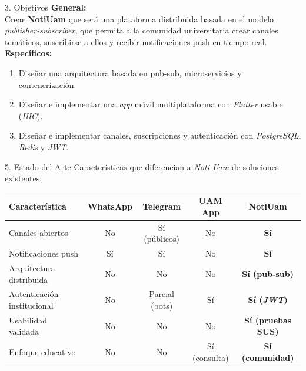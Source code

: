 \documentclass[final]{beamer}
\begin{document}
\begin{frame}[t]
\begin{minipage}[t]{0.48\textwidth}
        \begin{block}{\Large 3. Objetivos}
            \textbf{General:}\\
            Crear \textbf{NotiUam} que será una plataforma distribuida basada en el modelo \textit{publisher-subscriber}, que permita a la comunidad universitaria crear canales temáticos, suscribirse a ellos y recibir notificaciones push en tiempo real. 
            \\
            \vskip 0.8cm
            \textbf{Específicos:}
            \begin{enumerate}[leftmargin=*, itemsep=1pt]
                \item Diseñar una arquitectura basada en pub-sub, microservicios y contenerización.
                \item Diseñar e implementar una \textit{app} móvil multiplataforma con \textit{Flutter} usable (\textit{IHC}).
                \item Diseñar e implementar canales, suscripciones y autenticación con \textit{PostgreSQL}, \textit{Redis} y \textit{JWT}.
            \end{enumerate}
        \end{block}

        \begin{block}{\Large 5. Estado del Arte}
            \small{Características que diferencian a \emph{Noti Uam} de soluciones existentes:}
            \begin{table}[H]
                \centering
                \footnotesize
                \setlength{\tabcolsep}{10pt}
                \renewcommand{\arraystretch}{1.2}
                \begin{tabular}{|l|c|c|c|c|}
                    \toprule
                    \textbf{Característica} & \textbf{WhatsApp} & \textbf{Telegram} & \textbf{UAM App} & \textbf{NotiUam} \\
                    \midrule
                    Canales abiertos & No & Sí (públicos) & No & \textbf{Sí} \\
                    Notificaciones push & Sí & Sí & No & \textbf{Sí} \\
                    Arquitectura distribuida & No & No & No & \textbf{Sí (pub-sub)} \\
                    Autenticación institucional & No & Parcial (bots) & Sí & \textbf{Sí (\textit{JWT})} \\
                    Usabilidad validada & No & No & No & \textbf{Sí (pruebas SUS)} \\
                    Enfoque educativo & No & No & Sí (consulta) & \textbf{Sí (comunidad)} \\
                    \bottomrule
                \end{tabular}
            \end{table}
        \end{block}


\end{minipage}
\end{frame}
\end{document}
